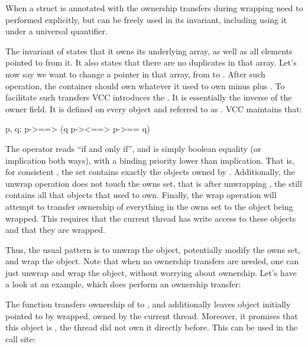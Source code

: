 When a struct is annotated with  the ownership transfers
during wrapping need to performed explicitly, but  can
be freely used in its invariant, including using it under a universal
quantifier.


\noindent
The invariant of  states that it owns its underlying array,
as well as all elements pointed to from it.
It also states that there are no duplicates in that array.
Let's now say we want to change a pointer in that array,
from  to .
After such operation, the container should own whatever it used
to own minus  plus .
To facilitate such transfers VCC introduces the .
It is essentially the inverse of the owner field.
It is defined on every object  and referred to as .
VCC maintains that:
\begin{VCC}
\forall \object p, q; p->\consistent ==> 
  (q \in p->\owns <==> p->\owner == q)
\end{VCC}
The operator \vcc{<==>} reads ``if and only if'', and is simply boolean
equality (or implication both ways), with a binding priority lower than implication.
That is, for consistent , the set  contains exactly
the objects owned by .
Additionally, the unwrap operation does not touch the owns set,
that is after unwrapping , the  still contains
all that objects that  used to own.
Finally, the wrap operation will attempt to transfer ownership
of everything in the owns set to the object being wrapped.
This requires that the current thread has write access to these objects
and that they are wrapped.

Thus, the usual pattern is to unwrap the object, potentially modify the owns
set, and wrap the object.
Note that when no ownership transfers are needed, one can just unwrap
and wrap the object, without worrying about ownership.
Let's have a look at an example, which does perform an ownership transfer:


\noindent
The  function transfers ownership of  to ,
and additionally leaves object initially pointed to by 
wrapped, \ie owned by the current thread.
Moreover, it promises that this object is , \ie the thread did not own
it directly before.
This can be used in the call site:

